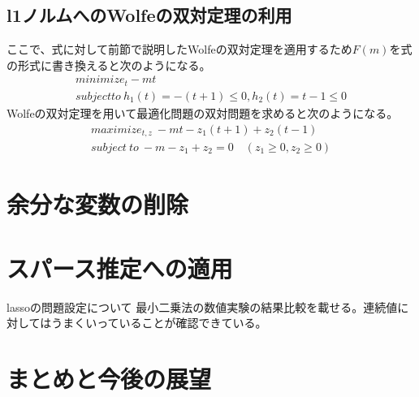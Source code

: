 \documentclass[paper]{ieicej}
\begin{document}
\subsection{l1ノルムへのWolfeの双対定理の利用}
ここで、式に対して前節で説明したWolfeの双対定理を適用するため$F(m)$を式の形式に書き換えると次のようになる。
\begin{eqnarray}
 minimize_{t} -mt \nonumber \\
 subject to \ h_{1}(t) = -(t+1) \leq 0,h_{2}(t) = t-1 \leq 0
\end{eqnarray}
Wolfeの双対定理を用いて最適化問題の双対問題を求めると次のようになる。
\begin{eqnarray}
 maximize_{t,z} \ -mt-z_{1}(t+1)+z_{2}(t-1) \nonumber \\
 subject \ to \ -m-z_{1}+z_{2}=0 \quad (z_{1}\geq 0,z_{2}\geq 0)
\end{eqnarray}

\section{余分な変数の削除}
\section{スパース推定への適用}
lassoの問題設定について
最小二乗法の数値実験の結果比較を載せる。連続値に対してはうまくいっていることが確認できている。

\section{まとめと今後の展望}

\ack %

%
%
\begin{thebibliography}{99}%
\bibitem{}
\end{thebibliography}

\appendix
\section{}

\begin{biography}
\end{biography}
\end{document}
